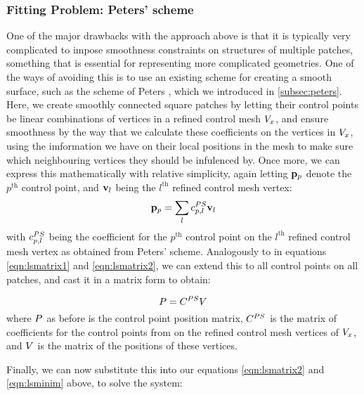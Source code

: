 \subsubsection{Fitting Problem: Peters' scheme}
\label{subsub:petersleastsq}
One of the major drawbacks with the approach above is that it is typically very complicated to impose smoothness constraints on structures of multiple patches, something that is essential for representing more complicated geometries. One of the ways of avoiding this is to use an existing scheme for creating a smooth surface, such as the scheme of Peters \cite{peters1992constructing,eck1996automatic}, which we introduced in \autoref{subsec:peters}. Here, we create smoothly connected square \Bez patches by letting their control points be linear combinations of vertices in a refined control mesh $\petersPatchPoints$, and ensure smoothness by the way that we calculate these coefficients on the vertices in $\petersPatchPoints$, using the imformation we have on their local positions in the mesh to make sure which neighbouring vertices they should be infulenced by. Once more, we can express this mathematically with relative simplicity, again letting $\lsControlPointi{p}$ denote the $p^\text{th}$ control point, and $\petersPatchPointVec_l$ being the $l^\text{th}$ refined control mesh vertex:
\begin{equation}
\lsControlPointi{p} = \sum\limits_{l} \petersControlPointCoef_{p,l} \petersPatchPointVec_l
\end{equation} 
with $\petersControlPointCoef_{p,l}$ being the coefficient for the $p^\text{th}$ \Bez control point on the $l^\text{th}$ refined control mesh vertex as obtained from Peters' scheme. Analogously to in equations \ref{eqn:lsmatrix1} and \ref{eqn:lsmatrix2}, we can extend this to all \Bez control points on all patches, and cast it in a matrix form to obtain:

\begin{equation}
\lsControlPointMatrix = \petersControlPointCoefMatrix\petersPatchPointMatrix
\end{equation}
where $\lsControlPointMatrix$ as before is the \Bez control point position matrix, $\petersControlPointCoefMatrix$ is the matrix of coefficients for the \Bez control points from on the refined control mesh vertices of $\petersPatchPoints$, and $\petersPatchPointMatrix$ is the matrix of the positions of these vertices. 

Finally, we can now substitute this into our equations \ref{eqn:lsmatrix2} and \ref{eqn:lsminim} above, to solve the system:

